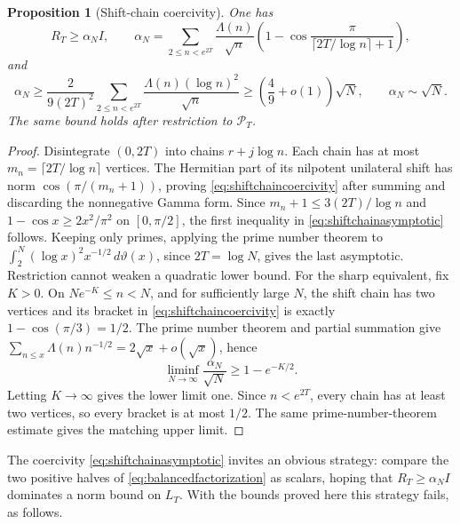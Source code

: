 \documentclass[11pt]{amsart}
\newtheorem{proposition}[theorem]{Proposition}
\theoremstyle{definition}
\theoremstyle{remark}
\begin{document}
\begin{proposition}[Shift-chain coercivity]\label{prop:shiftchaincoercivity}
One has
\begin{equation}\label{eq:shiftchaincoercivity}
 R_T\ge \alpha_N I,\qquad
 \alpha_N=\sum_{2\le n<e^{2T}}\frac{\Lambda(n)}{\sqrt n}
 \left(1-\cos\frac{\pi}{\lceil2T/\log n\rceil+1}\right),
\end{equation}
and
\begin{equation}\label{eq:shiftchainasymptotic}
 \alpha_N\ge \frac{2}{9(2T)^2}
 \sum_{2\le n<e^{2T}}\frac{\Lambda(n)(\log n)^2}{\sqrt n}
 \ge\left(\frac49+o(1)\right)\sqrt N,
 \qquad \alpha_N\sim\sqrt N.
\end{equation}
The same bound holds after restriction to \(\mathcal P_T\).
\end{proposition}

\begin{proof}
Disintegrate \((0,2T)\) into chains \(r+j\log n\).  Each chain has at most
\(m_n=\lceil2T/\log n\rceil\) vertices.  The Hermitian part of its nilpotent
unilateral shift has norm \(\cos(\pi/(m_n+1))\), proving
\eqref{eq:shiftchaincoercivity} after summing and discarding the nonnegative
Gamma form.  Since \(m_n+1\le3(2T)/\log n\) and
\(1-\cos x\ge2x^2/\pi^2\) on \([0,\pi/2]\), the first inequality in
\eqref{eq:shiftchainasymptotic} follows.  Keeping only primes, applying the
prime number theorem to
\(\int_2^N(\log x)^2x^{-1/2}\,d\vartheta(x)\), since
\(2T=\log N\), gives the last asymptotic.  Restriction cannot weaken
a quadratic lower bound.  For the sharp equivalent, fix \(K>0\).  On
\(Ne^{-K}\le n<N\), and for sufficiently large \(N\), the shift chain has
two vertices and its bracket in \eqref{eq:shiftchaincoercivity} is exactly
\(1-\cos(\pi/3)=1/2\).  The prime number theorem and partial summation give
\(\sum_{n\le x}\Lambda(n)n^{-1/2}=2\sqrt x+o(\sqrt x)\), hence
\[
 \liminf_{N\to\infty}\frac{\alpha_N}{\sqrt N}\ge1-e^{-K/2}.
\]
Letting \(K\to\infty\) gives the lower limit one.  Since \(n<e^{2T}\),
every chain has at least two vertices, so every bracket is at most \(1/2\).
The same prime-number-theorem estimate gives the matching upper limit.
\end{proof}

The coercivity \eqref{eq:shiftchainasymptotic} invites an obvious strategy:
compare the two positive halves of \eqref{eq:balancedfactorization} as
scalars, hoping that \(R_T\ge\alpha_NI\) dominates a norm bound on \(L_T\).
With the bounds proved here this strategy fails, as follows.
\end{document}
